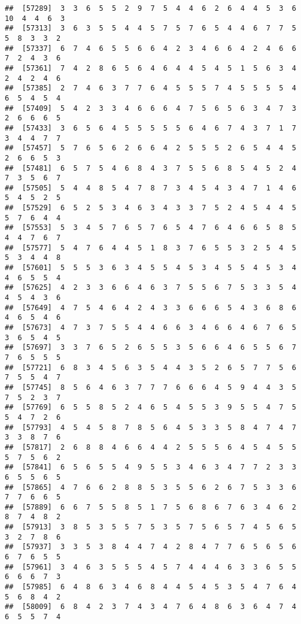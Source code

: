 \documentclass[
]{book}
\begin{document}
\begin{verbatim}
##  [57289]  3  3  6  5  5  2  9  7  5  4  4  6  2  6  4  4  5  3  6 10  4  4  6  3
##  [57313]  3  6  3  5  5  4  4  5  7  5  7  6  5  4  4  6  7  7  5  5  8  3  3  2
##  [57337]  6  7  4  6  5  5  6  6  4  2  3  4  6  6  4  2  4  6  6  7  2  4  3  6
##  [57361]  7  4  2  8  6  5  6  4  6  4  4  5  4  5  1  5  6  3  4  2  4  2  4  6
##  [57385]  2  7  4  6  3  7  7  6  4  5  5  5  7  4  5  5  5  5  4  6  5  4  5  4
##  [57409]  5  4  2  3  3  4  6  6  6  4  7  5  6  5  6  3  4  7  3  2  6  6  6  5
##  [57433]  3  6  5  6  4  5  5  5  5  5  6  4  6  7  4  3  7  1  7  3  4  4  7  7
##  [57457]  5  7  6  5  6  2  6  6  4  2  5  5  5  2  6  5  4  4  5  2  6  6  5  3
##  [57481]  6  5  7  5  4  6  8  4  3  7  5  5  6  8  5  4  5  2  4  7  3  5  6  7
##  [57505]  5  4  4  8  5  4  7  8  7  3  4  5  4  3  4  7  1  4  6  5  4  5  2  5
##  [57529]  6  5  2  5  3  4  6  3  4  3  3  7  5  2  4  5  4  4  5  5  7  6  4  4
##  [57553]  5  3  4  5  7  6  5  7  6  5  4  7  6  4  6  6  5  8  5  4  4  7  6  7
##  [57577]  5  4  7  6  4  4  5  1  8  3  7  6  5  5  3  2  5  4  5  5  3  4  4  8
##  [57601]  5  5  5  3  6  3  4  5  5  4  5  3  4  5  5  4  5  3  4  4  6  5  5  4
##  [57625]  4  2  3  3  6  6  4  6  3  7  5  5  6  7  5  3  3  5  4  4  5  4  3  6
##  [57649]  4  7  5  4  6  4  2  4  3  3  6  6  6  5  4  3  6  8  6  4  6  5  4  6
##  [57673]  4  7  3  7  5  5  4  4  6  6  3  4  6  6  4  6  7  6  5  3  6  5  4  5
##  [57697]  3  3  7  6  5  2  6  5  5  3  5  6  6  4  6  5  5  6  7  7  6  5  5  5
##  [57721]  6  8  3  4  5  6  3  5  4  4  3  5  2  6  5  7  7  5  6  7  5  5  4  7
##  [57745]  8  5  6  4  6  3  7  7  7  6  6  6  4  5  9  4  4  3  5  7  5  2  3  7
##  [57769]  6  5  5  8  5  2  4  6  5  4  5  5  3  9  5  5  4  7  5  5  4  7  2  6
##  [57793]  4  5  4  5  8  7  8  5  6  4  5  3  3  5  8  4  7  4  7  3  3  8  7  6
##  [57817]  2  6  8  8  4  6  6  4  4  2  5  5  5  6  4  5  4  5  5  5  7  5  6  2
##  [57841]  6  5  6  5  5  4  9  5  5  3  4  6  3  4  7  7  2  3  3  6  5  5  6  5
##  [57865]  4  7  6  6  2  8  8  5  3  5  5  6  2  6  7  5  3  3  6  7  7  6  6  5
##  [57889]  6  6  7  5  5  8  5  1  7  5  6  8  6  7  6  3  4  6  2  8  7  4  8  2
##  [57913]  3  8  5  3  5  5  7  5  3  5  7  5  6  5  7  4  5  6  5  3  2  7  8  6
##  [57937]  3  3  5  3  8  4  4  7  4  2  8  4  7  7  6  5  6  5  6  6  7  6  5  5
##  [57961]  3  4  6  3  5  5  5  4  5  7  4  4  4  6  3  3  6  5  5  6  6  6  7  3
##  [57985]  6  4  8  6  3  4  6  8  4  4  5  4  5  3  5  4  7  6  4  5  6  8  4  2
##  [58009]  6  8  4  2  3  7  4  3  4  7  6  4  8  6  3  6  4  7  4  6  5  5  7  4

\end{verbatim}
\end{document}

